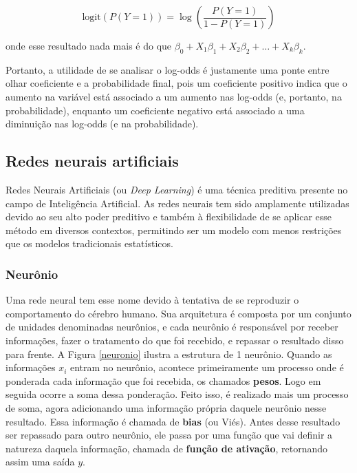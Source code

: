 \begin{equation}
  \text{logit}(P(Y=1)) = \log \left( \frac{P(Y=1)}{1 - P(Y=1)} \right)
\end{equation}

\noindent onde esse resultado nada mais é do que $\beta_0 + X_{1}\beta_1 + X_{2}\beta_2 + \ldots +X_{k}\beta_k$. 

Portanto, a utilidade de se analisar o log-odds é justamente uma ponte entre olhar coeficiente e a probabilidade final, 
pois um coeficiente positivo indica que o aumento na variável está associado a um aumento nas log-odds 
(e, portanto, na probabilidade), enquanto um coeficiente negativo está associado a uma diminuição nas log-odds (e na probabilidade).


\subsection{Redes neurais artificiais}

Redes Neurais Artificiais (ou \textit{Deep Learning}) é uma técnica preditiva presente no campo de Inteligência Artificial. As redes neurais tem sido amplamente utilizadas devido ao seu alto poder preditivo e também à flexibilidade de se aplicar esse método em diversos contextos, permitindo ser um modelo com menos restrições que os modelos tradicionais estatísticos.


\subsubsection{Neurônio}

Uma rede neural tem esse nome devido à tentativa de se reproduzir o comportamento do cérebro humano. Sua arquitetura é composta por um conjunto de unidades denominadas neurônios, e cada neurônio é responsável por receber informações, fazer o tratamento do que foi recebido, e repassar o resultado disso para frente. A Figura \ref{neuronio} ilustra a estrutura de 1 neurônio. Quando as informações $x_i$ entram no neurônio, acontece primeiramente um processo onde é ponderada cada informação que foi recebida, os chamados \textbf{pesos}. Logo em seguida ocorre a soma dessa ponderação. Feito isso, é realizado mais um processo de soma, agora adicionando uma informação própria daquele neurônio nesse resultado. Essa informação é chamada de \textbf{bias} (ou Viés). Antes desse resultado ser repassado para outro neurônio, ele passa por uma função que vai definir a natureza daquela informação, chamada de \textbf{função de ativação}, retornando assim uma saída $y$.

